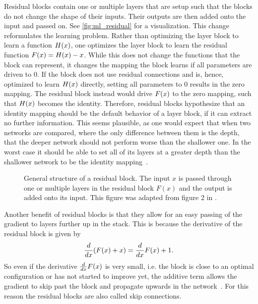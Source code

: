 Residual blocks contain one or multiple layers that are setup such that the blocks do not change the shape of their inputs. Their outputs are then added onto the input and passed on. See \autoref{fig:ml_residual} for a visualization. This change reformulates the learning problem. Rather than optimizing the layer block to learn a function $H{\left( x \right)}$, one optimizes the layer block to learn the residual function $F{\left( x \right)}=H{\left( x \right)} - x$. While this does not change the functions that the block can represent, it changes the mapping the block learns if all parameters are driven to $0$. If the block does not use residual connections and is, hence, optimized to learn $H{\left( x \right)}$ directly, setting all parameters to $0$ results in the zero mapping. The residual block instead would drive $F{\left( x \right)}$ to the zero mapping, such that $H{\left( x \right)}$ becomes the identity. Therefore, residual blocks hypothesize that an identity mapping should be the default behavior of a layer block, if it can extract no further information. This seems plausible, as one would expect that when two networks are compared, where the only difference between them is the depth, that the deeper network should not perform worse than the shallower one. In the worst case it should be able to set all of its layers at a greater depth than the shallower network to be the identity mapping~\cite{He:2015aaa}.
\begin{figure}
	\centering
	
	\caption[Residual block]{General structure of a residual block. The input $x$ is passed through one or multiple layers in the residual block $F(x)$ and the output is added onto its input. This figure was adapted from figure 2 in \cite{He:2015aaa}.}\label{fig:ml_residual}
\end{figure}

Another benefit of residual blocks is that they allow for an easy passing of the gradient to  layers further up in the stack. This is because the derivative of the residual block is given by
\begin{equation}
\frac{d}{dx}{\left( F{\left( x \right)}+x \right)} = \frac{d}{dx}F{\left( x \right)}+1.
\end{equation}
So even if the derivative $\frac{d}{dx}F{\left( x \right)}$ is very small, i.e. the block is close to an optimal configuration or has not started to improve yet, the additive term allows the gradient to skip past the block and propagate upwards in the network~\cite{Geron:2017aaa, He:2015aaa}. For this reason the residual blocks are also called skip connections.
